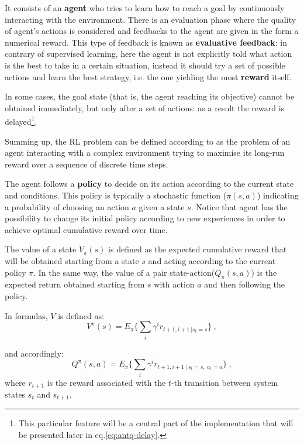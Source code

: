\documentclass[10pt]{article}
\begin{document}
It consists of an  \textbf{agent}  who tries to learn how to reach a goal by continuously interacting with  the environment. 
There is an evaluation phase where the quality of agent's actions is considered and feedbacks to the agent are given in the form a numerical reward. 
This type of feedback is known as \textbf{evaluative feedback}: in contrary of supervised learning, here the agent is not explicitly told what action is the best to take in a  certain  situation, instead it should try a set of possible actions and learn the best strategy, i.e. the one yielding the most \textbf{reward} itself.  

In some cases, the goal state (that is, the agent reaching its objective) cannot be obtained immediately, but only after a set of actions: as a result the reward is delayed\footnote{This particular feature will be a central part of the implementation that will be presented later in eq.\ref{eq:antq-delay}.}. 

Summing up, the  RL  problem  can  be  defined according to \cite{diciotto} as  the  problem  of  an agent  interacting  with  a  complex environment trying to maximise its long-run reward over a sequence of discrete time steps.

The agent follows a \textbf{policy} to decide on its action according to the current state and conditions. 
This policy is typically a  stochastic  function ($\pi(s,a)$) indicating a probability  of  choosing an action $a$ given a state $s$.
Notice that agent has the possibility to change its initial policy  according  to  new experiences  in order to  achieve  optimal cumulative  reward  over  time.  

The  value  of  a  state $V_\pi(s)$  is  defined  as  the  expected  cumulative reward that  will  be  obtained starting from a state $s$ and acting according to the current policy $\pi$. 
In the same way, the value of  a pair state-action($Q_\pi(s,a)$) is  the  expected  return  obtained starting  from  $s$  with  action $a$  and  then following  the policy. 

In formulas, $V$ is defined as:
\begin{equation}
V^\pi(s)=E_\pi \{ \sum_i \gamma^i r_{t+1, i+1 ~ | s_t=s } \}~,
\end{equation}

and accordingly:
\begin{equation}
Q^\pi(s,a)=E_\pi \{ \sum_i \gamma^i r_{t+1, i+1 ~|~ s_t=s,~ a_t=a } \}~,
\end{equation}
where $r_{t+1}$ is the reward associated with the $t$-th transition between system states $s_t$ and $s_{t+1}$.
\end{document}
